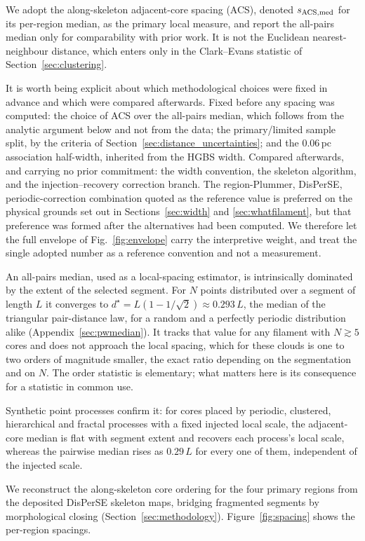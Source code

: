 \documentclass[usenatbib,twoside,twocolumn]{mnras}
\begin{document}
We adopt the along-skeleton adjacent-core spacing (ACS), denoted $s_{\rm ACS,med}$ for its per-region median, as the primary local measure, and report the all-pairs median only for comparability with prior work. It is not the Euclidean nearest-neighbour distance, which enters only in the Clark--Evans statistic of Section~\ref{sec:clustering}.

It is worth being explicit about which methodological choices were fixed in advance and which were compared afterwards. Fixed before any spacing was computed: the choice of ACS over the all-pairs median, which follows from the analytic argument below and not from the data; the primary/limited sample split, by the criteria of Section~\ref{sec:distance_uncertainties}; and the $0.06$\,pc association half-width, inherited from the HGBS width. Compared afterwards, and carrying no prior commitment: the width convention, the skeleton algorithm, and the injection--recovery correction branch. The region-Plummer, DisPerSE, periodic-correction combination quoted as the reference value is preferred on the physical grounds set out in Sections~\ref{sec:width} and \ref{sec:whatfilament}, but that preference was formed after the alternatives had been computed. We therefore let the full envelope of Fig.~\ref{fig:envelope} carry the interpretive weight, and treat the single adopted number as a reference convention and not a measurement.

An all-pairs median, used as a local-spacing estimator, is intrinsically dominated by the extent of the selected segment. For $N$ points distributed over a segment of length $L$ it converges to $d^\star=L(1-1/\sqrt{2})\approx0.293\,L$, the median of the triangular pair-distance law, for a random and a perfectly periodic distribution alike (Appendix~\ref{sec:pwmedian}). It tracks that value for any filament with $N\gtrsim5$ cores and does not approach the local spacing, which for these clouds is one to two orders of magnitude smaller, the exact ratio depending on the segmentation and on $N$. The order statistic is elementary; what matters here is its consequence for a statistic in common use.

Synthetic point processes confirm it: for cores placed by periodic, clustered, hierarchical and fractal processes with a fixed injected local scale, the adjacent-core median is flat with segment extent and recovers each process's local scale, whereas the pairwise median rises as $0.29\,L$ for every one of them, independent of the injected scale.

We reconstruct the along-skeleton core ordering for the four primary regions from the deposited DisPerSE skeleton maps, bridging fragmented segments by morphological closing (Section~\ref{sec:methodology}). Figure~\ref{fig:spacing} shows the per-region spacings.
\end{document}
